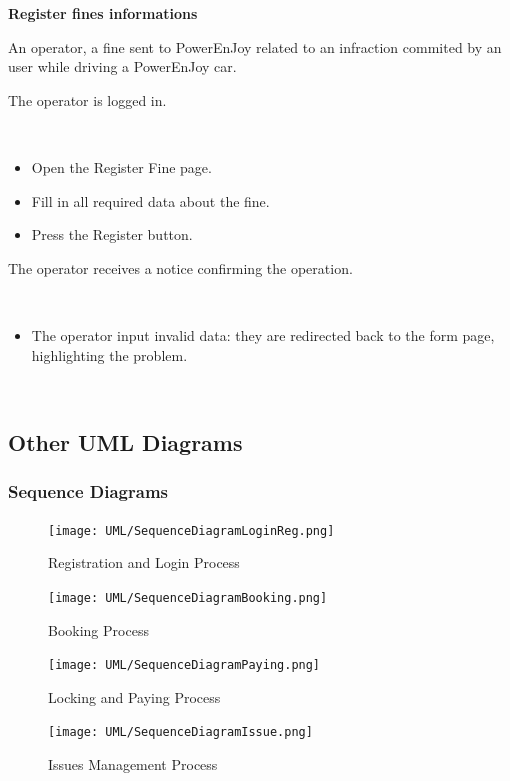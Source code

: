 \documentclass[11pt]{article} %
\newcommand{\pe}{PowerEnJoy }
\begin{document}
\begin{description}[noitemsep,topsep=0pt,parsep=0pt,partopsep=0pt]
	\item[Name:] \textbf{Register fines informations}
	\item[Actors Involved:] An operator, a fine sent to \pe related to an infraction commited by an user while driving a \pe car.
	\item[Entry Conditions:] The operator is logged in.
	\item[Flow Of Events:] \hfill\
	\begin{itemize}
		\item Open the Register Fine page.
		\item Fill in all required data about the fine.
		\item Press the Register button.
	\end{itemize}
	\item[Exit conditions:]  The operator receives a notice confirming the operation.
	\item[Exceptions:] \hfill\
	\begin{itemize}
		\item The operator input invalid data: they are redirected back to the form page, highlighting the problem.
	\end{itemize}
\end{description}
\hfill\

\subsection{Other UML Diagrams}

\subsubsection{Sequence Diagrams}
\begin{figure}[H]
	\centering
	\texttt{[image: UML/SequenceDiagramLoginReg.png]}
	\caption{Registration and Login Process}
\end{figure}
\begin{figure}[H]
	\centering
	\texttt{[image: UML/SequenceDiagramBooking.png]}
	\caption{Booking Process}
\end{figure}
\begin{figure}[H]
	\centering
	\texttt{[image: UML/SequenceDiagramPaying.png]}
	\caption{Locking and Paying Process}
\end{figure}
\begin{figure}[H]
	\centering
	\texttt{[image: UML/SequenceDiagramIssue.png]}
	\caption{Issues Management Process}
\end{figure}
\end{document}
